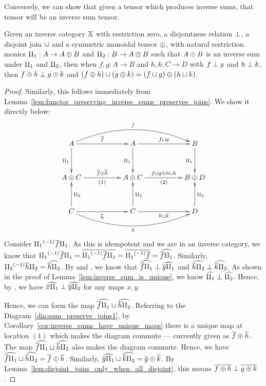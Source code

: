 Conversely, we can show that given a tensor which produces inverse sums, that tensor will
be an inverse sum tensor.

\begin{lemma}\label{lem:inverse_sums_give_inverse_sum_tensors}
  Given an inverse category $\mathbb{X}$ with restriction zero, a disjointness relation $\perp$, a
  disjoint join $\sqcup$ and a symmetric monoidal tensor $\oplus$, with natural restriction monics
  $\amalg_{1}: A\to A\oplus B$ and $\amalg_{2}: B \to A\oplus B$ such that $A\oplus B$ is an inverse sum under $\amalg_{1}$ and
  $\amalg_{2}$, then when $f,g :A \to B$ and $h,k:C\to D$ with $f \perp g$ and $h \perp k$, then $f
  \oplus h \perp g\oplus k$ and $(f\oplus h)\sqcup (g\oplus k) = (f\sqcup g)\oplus (h\sqcup k)$.
\end{lemma}
\begin{proof}
  Similarly, this follows immediately from
  Lemma~\ref{lem:functor_preserving_inverse_sums_preserves_joins}. We show it directly below:
  \begin{equation}
    \xymatrix@R+10pt@C+28pt {
      A \ar[r]^{\rst{f}} \ar[d]_{\cpa} \ar@/^20pt/[rr]^f
        & A \ar[d]_{\cpa} \ar[r]^{f\djoin g} & B \ar[d]_{\cpa}\\
      A\+C \ar[r]^{\rst{f}\+\rst{h}}_{(1)}
        & A\+C  \ar[r]^{f\djoin g \+ h\djoin k}_{(2)} & B \+D \\
      C \ar[r]_{\rst{h}} \ar[u]_{\cpb} \ar@/_20pt/[rr]_h
        & C \ar[u]_{\cpb} \ar[r]_{h\djoin k} & D \ar[u]_{\cpb}
    }\label{dia:sum_preserve_joins1}
  \end{equation}
  Consider ${\amalg_{1}}^{(-1)} \overline{f}\amalg_{1}$. As this is idempotent and we are in an inverse category, we
  know that ${\amalg_{1}}^{(-1)} \overline{f}\amalg_{1} = \overline{{\amalg_{1}}^{(-1)} \overline{f}\amalg_{1}} = \overline{{\amalg_{1}}^{(-1)}\overline{f}} =
  \widehat{\overline{f}\amalg_{1}}$. Similarly, ${\amalg_{2}}^{(-1)}\overline{h}\amalg_{2} = \widehat{\overline{h}\amalg_{2}}$. By  and
  , we know that $\widehat{\overline{f}\amalg_{1}} \perp \widehat{\overline{g}\amalg_{1}}$ and $\widehat{\overline{h}\amalg_{2}}
  \perp \widehat{\overline{k}\amalg_{2}}$. As shown in the proof of
  Lemma~\ref{lem:inverse_sum_is_unique}, we know $\widehat{\amalg_{1}}\perp \widehat{\amalg_{2}}$. Hence, by
  , we have $\widehat{\overline{x}\amalg_{1}} \perp \widehat{\overline{y}\amalg_{2}}$ for any maps $x,y$.

  Hence, we can form the map $\widehat{\overline{f}\amalg_{1}} \sqcup \widehat{\overline{h}\amalg_{2}}$. Referring to the
  Diagram~\ref{dia:sum_preserve_joins1}, by Corollary~\ref{cor:inverse_sums_have_unique_maps} there is
  a unique map at location $(1)$ which makes the diagram commute --- currently given as
  $\overline{f}\oplus\overline{h}$. The map $\widehat{\overline{f}\amalg_{1}} \sqcup \widehat{\overline{h}\amalg_{2}}$ also makes the diagram commute.
  Hence, we have $\widehat{\overline{f}\amalg_{1}} \sqcup \widehat{\overline{h}\amalg_{2}} = \overline{f}\oplus\overline{h}$. Similarly,
  $\widehat{\overline{g}\amalg_{1}} \sqcup \widehat{\overline{k}\amalg_{2}} = \overline{g}\oplus\overline{k}$. By
  Lemma~\ref{lem:disjoint_joins_only_when_all_disjoint}, this means $\overline{f\oplus h} \perp \overline{g\oplus k}$.


\end{proof}
